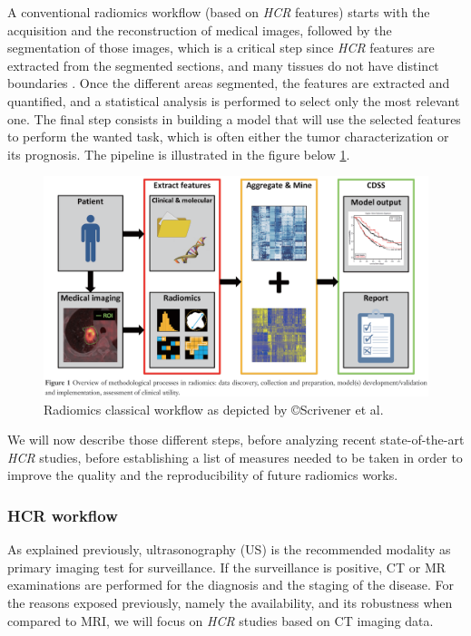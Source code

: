 \documentclass[]{article}
\begin{document}
A conventional radiomics workflow (based on \emph{HCR} features) starts
with the acquisition and the reconstruction of medical images, followed
by the segmentation of those images, which is a critical step since
\emph{HCR} features are extracted from the segmented sections, and many
tissues do not have distinct boundaries \cite{Gillies2016}. Once the different areas segmented, the features are
extracted and quantified, and a statistical analysis is performed to
select only the most relevant one. The final step consists in building a
model that will use the selected features to perform the wanted task,
which is often either the tumor characterization or its prognosis. The
pipeline is illustrated in the figure below \ref{Scrivener2016_Fig1}.


\begin{figure}[th!]
\centering
\includegraphics[width=0.7\linewidth]{images/image4}
\caption{Radiomics classical workflow as depicted by ©Scrivener et al. \cite{Scrivener2016}}
\label{Scrivener2016_Fig1}
\end{figure}


We will now describe those different steps, before analyzing recent
state-of-the-art \emph{HCR} studies, before establishing a list of
measures needed to be taken in order to improve the quality and the
reproducibility of future radiomics works.

\subsubsection*{HCR workflow}\label{hcr-workflow}

As explained previously, ultrasonography (US) is the recommended
modality as primary imaging test for surveillance. If the surveillance
is positive, CT or MR examinations are performed for the diagnosis and
the staging of the disease. For the reasons exposed previously, namely
the availability, and its robustness when compared to MRI, we will focus
on \emph{HCR} studies based on CT imaging data.
\end{document}
